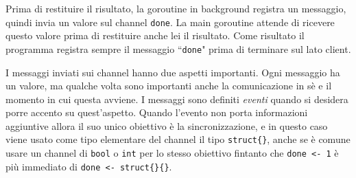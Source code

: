 \documentclass[../../../thesis.tex]{subfiles}
\begin{document}
    Prima di restituire il risultato, la goroutine in background registra un messaggio, quindi invia un valore sul channel \verb"done".
    La main goroutine attende di ricevere questo valore prima di restituire anche lei il risultato.
    Come risultato il programma registra sempre il messaggio ``\verb"done"" prima di terminare sul lato client.
    \hfill \vspace{12pt}

    I messaggi inviati sui channel hanno due aspetti importanti.
    Ogni messaggio ha un valore, ma qualche volta sono importanti anche la comunicazione in sè e il momento in cui questa avviene.
    I messaggi sono definiti \textit{eventi} quando si desidera porre accento su quest'aspetto.
    Quando l'evento non porta informazioni aggiuntive allora il suo unico obiettivo è la sincronizzazione, e in questo caso viene usato come tipo elementare del channel il tipo \verb"struct{}", anche se è comune usare un channel di \verb"bool" o \verb"int" per lo stesso obiettivo fintanto che \verb"done <- 1" è più immediato di \verb"done <- struct{}{}".
\end{document}
